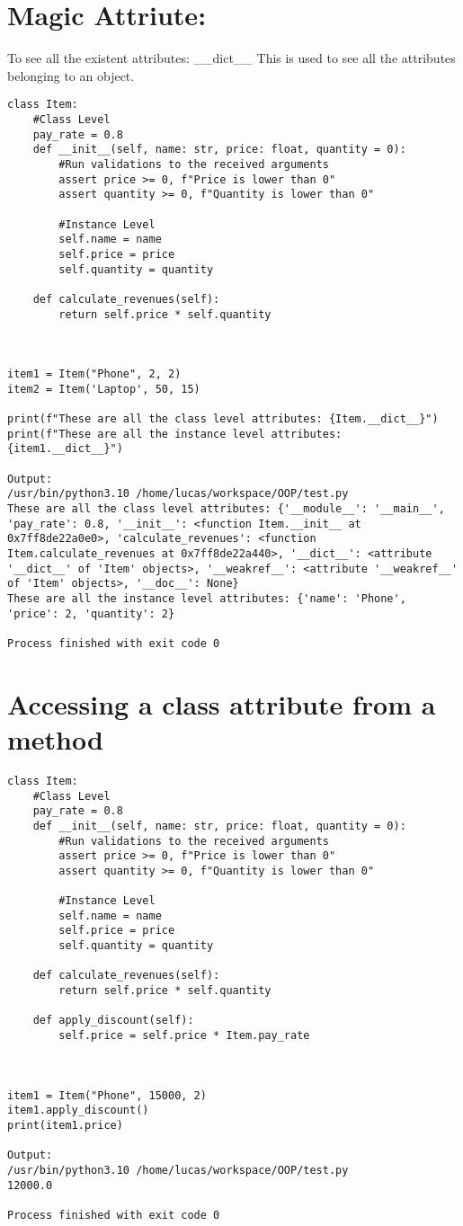 \documentclass{article}
\begin{document}
\section{Magic Attriute:}
To see all the existent attributes: \_\_dict\_\_
This is used to see all the attributes belonging to an object.

\begin{lstlisting}
class Item:
	#Class Level
	pay_rate = 0.8
	def __init__(self, name: str, price: float, quantity = 0):
		#Run validations to the received arguments
		assert price >= 0, f"Price is lower than 0"
		assert quantity >= 0, f"Quantity is lower than 0"
	
		#Instance Level
		self.name = name
		self.price = price
		self.quantity = quantity
		
	def calculate_revenues(self):
		return self.price * self.quantity
	
	

item1 = Item("Phone", 2, 2)
item2 = Item('Laptop', 50, 15)

print(f"These are all the class level attributes: {Item.__dict__}")
print(f"These are all the instance level attributes: {item1.__dict__}")

Output:
/usr/bin/python3.10 /home/lucas/workspace/OOP/test.py 
These are all the class level attributes: {'__module__': '__main__', 'pay_rate': 0.8, '__init__': <function Item.__init__ at 0x7ff8de22a0e0>, 'calculate_revenues': <function Item.calculate_revenues at 0x7ff8de22a440>, '__dict__': <attribute '__dict__' of 'Item' objects>, '__weakref__': <attribute '__weakref__' of 'Item' objects>, '__doc__': None}
These are all the instance level attributes: {'name': 'Phone', 'price': 2, 'quantity': 2}

Process finished with exit code 0
\end{lstlisting}

\section{Accessing a class attribute from a method}

\begin{lstlisting}
class Item:
	#Class Level
	pay_rate = 0.8
	def __init__(self, name: str, price: float, quantity = 0):
		#Run validations to the received arguments
		assert price >= 0, f"Price is lower than 0"
		assert quantity >= 0, f"Quantity is lower than 0"
		
		#Instance Level
		self.name = name
		self.price = price
		self.quantity = quantity
	
	def calculate_revenues(self):
		return self.price * self.quantity
	
	def apply_discount(self):
		self.price = self.price * Item.pay_rate



item1 = Item("Phone", 15000, 2)
item1.apply_discount()
print(item1.price)

Output:
/usr/bin/python3.10 /home/lucas/workspace/OOP/test.py 
12000.0

Process finished with exit code 0


\end{lstlisting}
\end{document}
